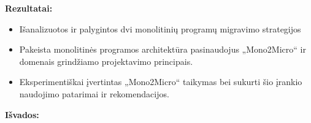\documentclass{VUMIFPSbakalaurinis}
\begin{document}
\textbf{Rezultatai:}
\begin{itemize}
    \item Išanalizuotos ir palygintos dvi monolitinių programų migravimo strategijos

    \item Pakeista monolitinės programos architektūra pasinaudojus „Mono2Micro“ ir domenais grindžiamo projektavimo principais.

    \item Eksperimentiškai įvertintas „Mono2Micro“ taikymas bei sukurti šio įrankio naudojimo patarimai ir rekomendacijos.





    
    
\end{itemize}
\textbf{Išvados:}
\end{document}
